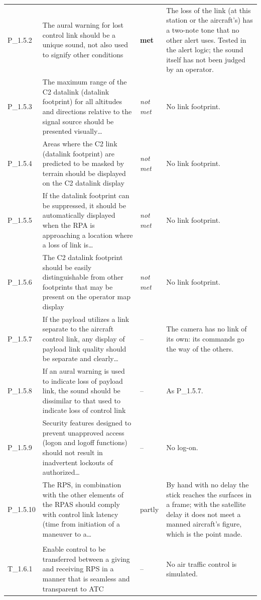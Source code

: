 \begin{longtable}{@{}>{\raggedright\arraybackslash}p{12mm}>{\raggedright\arraybackslash}p{57mm}>{\raggedright\arraybackslash}p{13mm}>{\raggedright\arraybackslash}p{70mm}@{}}
P\_1.5.2 & The aural warning for lost control link should be a unique sound, not also used to signify other conditions & \textbf{met} & The loss of the link (at this station or the aircraft's) has a two-note tone that no other alert uses. Tested in the alert logic; the sound itself has not been judged by an operator. \\
P\_1.5.3 & The maximum range of the C2 datalink (datalink footprint) for all altitudes and directions relative to the signal source should be presented visually\ldots{} & \emph{not met} & No link footprint. \\
P\_1.5.4 & Areas where the C2 link (datalink footprint) are predicted to be masked by terrain should be displayed on the C2 datalink display & \emph{not met} & No link footprint. \\
P\_1.5.5 & If the datalink footprint can be suppressed, it should be automatically displayed when the RPA is approaching a location where a loss of link is\ldots{} & \emph{not met} & No link footprint. \\
P\_1.5.6 & The C2 datalink footprint should be easily distinguishable from other footprints that may be present on the operator map display & \emph{not met} & No link footprint. \\
P\_1.5.7 & If the payload utilizes a link separate to the aircraft control link, any display of payload link quality should be separate and clearly\ldots{} & -- & The camera has no link of its own: its commands go the way of the others. \\
P\_1.5.8 & If an aural warning is used to indicate loss of payload link, the sound should be dissimilar to that used to indicate loss of control link & -- & As P\_1.5.7. \\
P\_1.5.9 & Security features designed to prevent unapproved access (logon and logoff functions) should not result in inadvertent lockouts of authorized\ldots{} & -- & No log-on. \\
P\_1.5.10 & The RPS, in combination with the other elements of the RPAS should comply with control link latency (time from initiation of a maneuver to a\ldots{} & partly & By hand with no delay the stick reaches the surfaces in a frame; with the satellite delay it does not meet a manned aircraft's figure, which is the point made. \\
\addlinespace\multicolumn{4}{@{}l}{\textbf{Handing over control}} \\
T\_1.6.1 & Enable control to be transferred between a giving and receiving RPS in a manner that is seamless and transparent to ATC & -- & No air traffic control is simulated. \\

\end{longtable}
